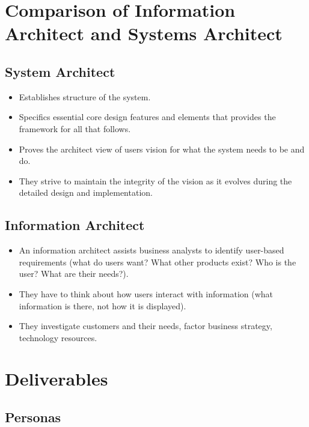 \section{Comparison of Information Architect and Systems Architect}\label{sec:comparison_of_information_architect_and_systems_architect}

\subsection{System Architect}\label{sub:system_architect}

\begin{itemize}
	\item Establishes structure of the system.
	\item Specifics essential core design features and elements that provides the framework for all that follows.
	\item Proves the architect view of users vision for what the system needs to be and do.
	\item They strive to maintain the integrity of the vision as it evolves during the detailed design and implementation.
\end{itemize}

\subsection{Information Architect}\label{sub:information_architect}

\begin{itemize}
	\item An information architect assists business analysts to identify user-based requirements (what do users want? What other products exist? Who is the user? What are their needs?).
	\item They have to think about how users interact with information (what information is there, not how it is displayed).
	\item They investigate customers and their needs, factor business strategy, technology resources.
\end{itemize}

\section{Deliverables}\label{sec:deliverables}

\subsection{Personas}\label{sub:personas}

